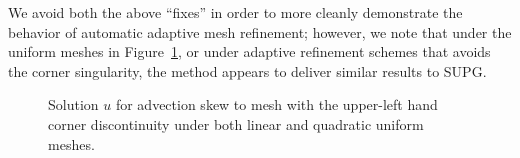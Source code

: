 \documentclass[final,leqno]{siamltex}
\begin{document}
We avoid both the above ``fixes'' in order to more cleanly demonstrate the behavior of automatic adaptive mesh refinement; however, we note that under the uniform meshes in Figure~\ref{fig:skewUnif}, or under adaptive refinement schemes that avoids the corner singularity, the method appears to deliver similar results to SUPG.  
\begin{figure}[!h]
\centering
{}
\caption{Solution $u$ for advection skew to mesh with the upper-left hand corner discontinuity under both linear and quadratic uniform meshes.}
\label{fig:skewUnif}
\end{figure}
\end{document}
